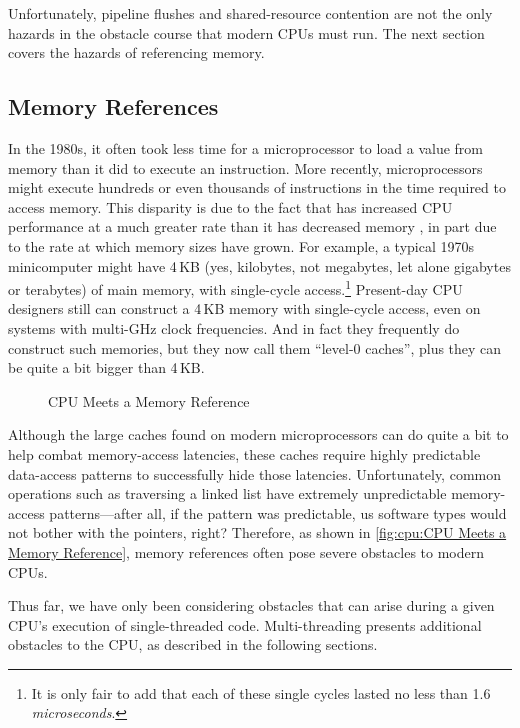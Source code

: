 Unfortunately, pipeline flushes and shared-resource contention are not
the only hazards in the obstacle course that modern CPUs must run.
The next section covers the hazards of referencing memory.

\subsection{Memory References}
\label{sec:cpu:Memory References}

In the 1980s, it often took less time for a microprocessor to load a value
from memory than it did to execute an instruction.
More recently, microprocessors might execute hundreds or even thousands
of instructions in the time required to access memory.
This disparity is due to the fact that  has increased CPU
performance at a much greater rate than it has decreased memory ,
in part due to the rate at which memory sizes have grown.
For example, a typical 1970s minicomputer might have 4\,KB (yes, kilobytes,
not megabytes, let alone gigabytes or terabytes) of main memory, with
single-cycle access.\footnote{
	It is only fair to add that each of these single cycles
	lasted no less than 1.6 \emph{microseconds}.}
Present-day CPU designers still can construct a 4\,KB memory with single-cycle
access, even on systems with multi-GHz clock frequencies.
And in fact they frequently do construct such memories, but they now
call them ``level-0 caches'', plus they can be quite a bit bigger than 4\,KB.

\begin{figure}
\centering
{}
\caption{CPU Meets a Memory Reference}
\end{figure}

Although the large caches found on modern microprocessors can do quite
a bit to help combat memory-access latencies,
these caches require highly predictable data-access patterns to
successfully hide those latencies.
Unfortunately, common operations such as traversing a linked list
have extremely unpredictable memory-access patterns---after all,
if the pattern was predictable, us software types would not bother
with the pointers, right?
Therefore, as shown in
\cref{fig:cpu:CPU Meets a Memory Reference},
memory references often pose severe obstacles to modern CPUs.

Thus far, we have only been considering obstacles that can arise during
a given CPU's execution of single-threaded code.
Multi-threading presents additional obstacles to the CPU, as
described in the following sections.

